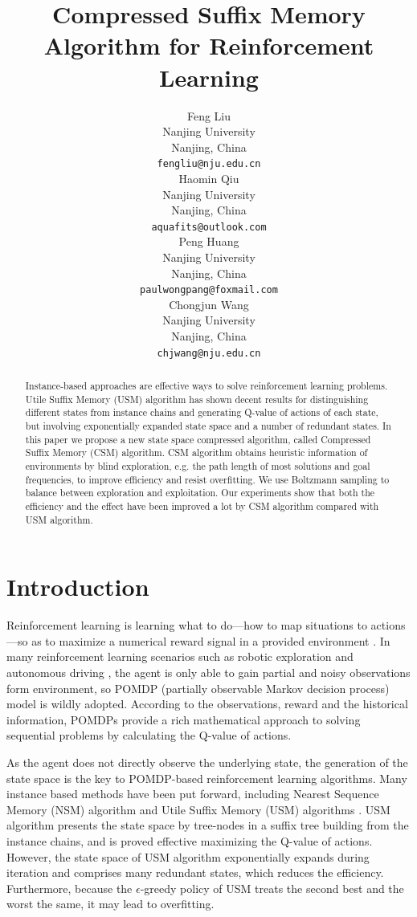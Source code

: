 \documentclass{article}
\title{Compressed Suffix Memory Algorithm for Reinforcement Learning%
}
\author{%
  Feng Liu\\ 
  Nanjing University\\ 
  Nanjing, China \\
  \texttt{fengliu@nju.edu.cn} \\
  \And
  Haomin Qiu \\
  Nanjing University\\ 
  Nanjing, China \\
  \texttt{aquafits@outlook.com} \\
  \And
  Peng Huang \\
  Nanjing University\\ 
  Nanjing, China \\
  \texttt{paulwongpang@foxmail.com} \\
  \And
  Chongjun Wang \\
  Nanjing University\\ 
  Nanjing, China \\
  \texttt{chjwang@nju.edu.cn} \\
}
\begin{document}
\maketitle 

\begin{abstract}
  Instance-based approaches are effective ways to solve reinforcement
  learning problems. Utile Suffix Memory (USM) algorithm has shown decent results for
  distinguishing different states from instance chains and generating Q-value 
  of actions of each state, but involving exponentially expanded state space and
  a number of redundant states. In this paper we propose a new state space compressed
  algorithm, called Compressed Suffix Memory (CSM) algorithm. CSM algorithm obtains
  heuristic information of environments by blind exploration, e.g. the path length
  of most solutions and goal frequencies, to improve efficiency and resist overfitting.
  We use Boltzmann sampling to balance between exploration and exploitation. Our experiments
  show that both the efficiency and the effect have been improved a lot by CSM algorithm
  compared with USM algorithm.
\end{abstract}

\section{Introduction}

Reinforcement learning is learning what to do—how to map situations to actions—so
as to maximize a numerical reward signal in a provided environment
\cite{sutton2018reinforcement}. In many reinforcement learning scenarios such as
robotic exploration \cite{smith2007probabilistic} and autonomous driving
\cite{bai2015intention}, the agent is only able to gain partial and noisy
observations form environment, so POMDP (partially observable Markov decision
process) model is wildly adopted. According to the observations, reward and the
historical information, POMDPs provide a rich mathematical approach to solving
sequential problems by calculating the Q-value of actions.

As the agent does not directly observe the underlying state, the generation of
the state space is the key to POMDP-based reinforcement learning algorithms.
Many instance based methods have been put forward, including Nearest Sequence
Memory (NSM) algorithm \cite{mccallum1997reinforcement} and Utile Suffix Memory
(USM) algorithms \cite{mccallum1995instance}. USM algorithm presents the state space by
tree-nodes in a suffix tree building from the instance chains, and is proved
effective maximizing the Q-value of actions. However, the state space of USM
algorithm exponentially expands during iteration and comprises many redundant
states, which reduces the efficiency. Furthermore, because the $\epsilon$-greedy
policy of USM treats the second best and the worst the same, it may lead to
overfitting.
\end{document}

